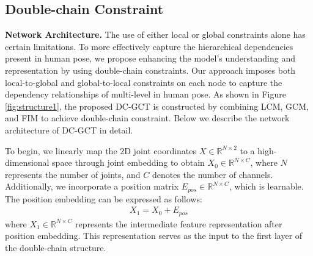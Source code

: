 \documentclass[journal]{IEEEtran}
\begin{document}
\subsection{Double-chain Constraint}





{\bf{Network Architecture.}} The use of either local or global constraints alone has certain limitations. To more effectively capture the hierarchical dependencies present in human pose, we propose enhancing the model's understanding and representation by using double-chain constraints. Our approach imposes both local-to-global and global-to-local constraints on each node to capture the dependency relationships of multi-level in human pose. As shown in Figure \ref{fig:structure1}, the proposed DC-GCT is constructed by combining LCM, GCM, and FIM to achieve double-chain constraint. Below we describe the network architecture of DC-GCT in detail.





To begin, we linearly map the 2D joint coordinates $X \in \mathbb{R}^{N \times 2}$ to a high-dimensional space through joint embedding to obtain $X_0 \in \mathbb{R}^{N \times C}$, where $N$ represents the number of joints, and $C$ denotes the number of channels. Additionally, we incorporate a position matrix $E_{pos} \in \mathbb{R}^{N \times C}$, which is learnable. The position embedding can be expressed as follows:
\begin{gather}
\label{eq:embed}
X_{1} = X_{0} + E_{pos}
\end{gather}
where $X_1 \in \mathbb{R}^{N \times C}$ represents the intermediate feature representation after position embedding. This representation serves as the input to the first layer of the double-chain structure. 
\end{document}
